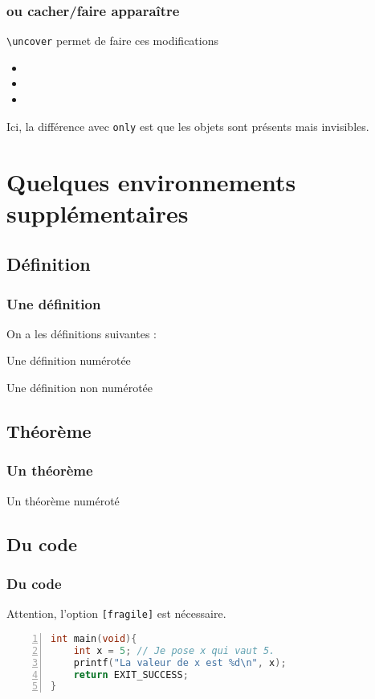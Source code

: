 \documentclass[12pt]{beamer}
\begin{document}
\begin{frame}
\frametitle{ou cacher/faire apparaître}
\texttt{\textbackslash uncover} permet de faire ces modifications
\begin{itemize}
\item {}
\item {}
\item {}
\end{itemize}

Ici, la différence avec \texttt{only} est que les objets sont présents mais invisibles.
\end{frame}


\section{Quelques environnements supplémentaires}

\subsection{Définition}
\begin{frame}
\frametitle{Une définition}
On a les définitions suivantes :
\begin{defi}{}{}
Une définition numérotée
\end{defi}

\begin{defi*}{}
Une définition non numérotée
\end{defi*}
\end{frame}

\subsection{Théorème}

\begin{frame}
\frametitle{Un théorème}

\begin{theo}{}{}
Un théorème numéroté
\end{theo}
\end{frame}

\subsection{Du code}

\begin{frame}[fragile]
\frametitle{Du code}

Attention, l'option \verb"[fragile]" est nécessaire.

\begin{lstlisting}[language=c, frame=single, numbers=left]
int main(void){
    int x = 5; // Je pose x qui vaut 5.
    printf("La valeur de x est %d\n", x);
    return EXIT_SUCCESS;
}
\end{lstlisting}
\end{frame}
\end{document}
